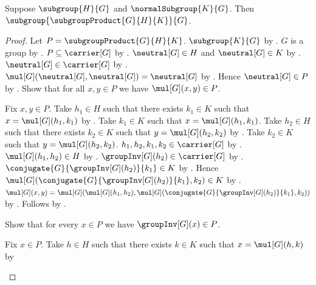 \begin{theorem}\label{subgroup_product_subgroup}
    Suppose $\subgroup{H}{G}$ and $\normalSubgroup{K}{G}$.
    Then $\subgroup{\subgroupProduct{G}{H}{K}}{G}$.
\end{theorem}
\begin{proof}
    Let $P=\subgroupProduct{G}{H}{K}$.
    $\subgroup{K}{G}$ by .
    $G$ is a group by .
    $P\subseteq\carrier[G]$ by
        .
    $\neutral[G]\in H$ and $\neutral[G]\in K$ by
        .
    $\neutral[G]\in\carrier[G]$ by
        .
    $\mul[G](\neutral[G],\neutral[G])=\neutral[G]$ by
        .
    Hence $\neutral[G]\in P$ by
        .
    Show that for all $x,y\in P$ we have $\mul[G](x,y)\in P$.
    \begin{subproof}
        Fix $x,y\in P$.
        Take $h_1\in H$ such that there exists $k_1\in K$ such that
            $x=\mul[G](h_1,k_1)$ by
            .
        Take $k_1\in K$ such that $x=\mul[G](h_1,k_1)$.
        Take $h_2\in H$ such that there exists $k_2\in K$ such that
            $y=\mul[G](h_2,k_2)$ by
            .
        Take $k_2\in K$ such that $y=\mul[G](h_2,k_2)$.
        $h_1,h_2,k_1,k_2\in\carrier[G]$ by
            .
        $\mul[G](h_1,h_2)\in H$ by .
        $\groupInv[G](h_2)\in\carrier[G]$ by
            .
        $\conjugate{G}{\groupInv[G](h_2)}{k_1}\in K$ by
            .
        Hence
            $\mul[G]
                (\conjugate{G}{\groupInv[G](h_2)}{k_1},k_2)
                \in K$ by .
        $\mul[G](x,y)=
            \mul[G]
                (\mul[G](h_1,h_2),
                 \mul[G]
                    (\conjugate{G}{\groupInv[G](h_2)}{k_1},k_2))$ by
            .
        Follows by .
    \end{subproof}
    Show that for every $x\in P$ we have $\groupInv[G](x)\in P$.
    \begin{subproof}
        Fix $x\in P$.
        Take $h\in H$ such that there exists $k\in K$ such that
            $x=\mul[G](h,k)$ by

\end{subproof}
\end{proof}
